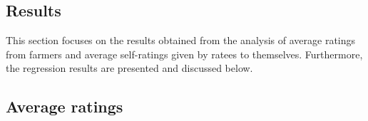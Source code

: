 \documentclass[12pt,english]{article}\usepackage[]{graphicx}\usepackage[]{color}
\begin{document}
\begin{onehalfspace}
\newpage{}
\end{onehalfspace}
\begin{onehalfspace}

\section{Results\label{sec:Results} }
\end{onehalfspace}

This section focuses on the results obtained from the analysis of
average ratings from farmers and average self-ratings given by ratees
to themselves. Furthermore, the regression results are  presented
and discussed below. 
\begin{onehalfspace}

\subsection{Average ratings\label{subsec:Average-ratings}}
\end{onehalfspace}
\end{document}
